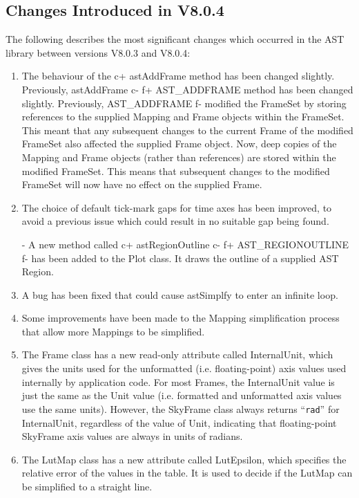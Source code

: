 \documentclass[twoside,11pt]{starlink}
\begin{document}
\subsection{Changes Introduced in V8.0.4}
The following describes the most significant changes which
occurred in the AST library between versions V8.0.3 and V8.0.4:

\begin{enumerate}

\item The behaviour of the
c+
astAddFrame method has been changed slightly. Previously, astAddFrame
c-
f+
AST\_ADDFRAME method has been changed slightly. Previously, AST\_ADDFRAME
f-
modified the FrameSet by storing references to the supplied Mapping and
Frame objects within the FrameSet. This meant that any subsequent changes
to the current Frame of the modified FrameSet also affected the supplied
Frame object. Now, deep copies of the Mapping and Frame objects (rather
than references) are stored within the modified FrameSet. This means that
subsequent changes to the modified FrameSet will now have no effect on
the supplied Frame.

\item The choice of default tick-mark gaps for time axes has been
improved, to avoid a previous issue which could result in no suitable gap
being found.

- A new method called
c+
astRegionOutline
c-
f+
AST\_REGIONOUTLINE
f-
has been added to the Plot class. It draws the outline of a supplied AST
Region.

\item A bug has been fixed that could cause astSimplfy to enter an infinite loop.

\item Some improvements have been made to the Mapping simplification process
that allow more Mappings to be simplified.

\item The Frame class has a new read-only attribute called InternalUnit,
which gives the units used for the unformatted (i.e. floating-point) axis
values used internally by application code. For most Frames, the
InternalUnit value is just the same as the Unit value (i.e. formatted and
unformatted axis values use the same units). However, the SkyFrame class
always returns ``\texttt{rad}'' for InternalUnit, regardless of the value of
Unit, indicating that floating-point SkyFrame axis values are always in units
of radians.

\item The LutMap class has a new attribute called LutEpsilon, which specifies
the relative error of the values in the table. It is used to decide if
the LutMap can be simplified to a straight line.

\end{enumerate}
\end{document}
